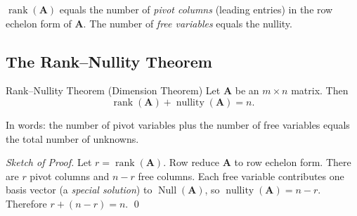\documentclass[12pt,a4paper]{article}
\newcommand{\rank}{\operatorname{rank}}
\newcommand{\nullity}{\operatorname{nullity}}
\newcommand{\Null}{\operatorname{Null}}
\newcommand{\mat}[1]{\mathbf{#1}}
\begin{document}
	\begin{remarkbox}{}{}
		\(\rank(\mat{A})\) equals the number of \emph{pivot columns} (leading entries) in the
		row echelon form of \(\mat{A}\).  The number of \emph{free variables} equals the
		nullity.
	\end{remarkbox}
	
	\subsection{The Rank--Nullity Theorem}
	
	\begin{thmbox}{Rank--Nullity Theorem (Dimension Theorem)}{}
		Let \(\mat{A}\) be an \(m \times n\) matrix.  Then
		\[
		\boxed{\rank(\mat{A}) + \nullity(\mat{A}) = n.}
		\]
	\end{thmbox}
	
	In words: the number of pivot variables plus the number of free variables equals the
	total number of unknowns.
	
	\begin{proof}[Sketch of Proof]
		Let \(r = \rank(\mat{A})\).  Row reduce \(\mat{A}\) to row echelon form.  There are
		\(r\) pivot columns and \(n - r\) free columns.  Each free variable contributes one
		basis vector (a \emph{special solution}) to \(\Null(\mat{A})\), so
		\(\nullity(\mat{A}) = n - r\).  Therefore \(r + (n - r) = n\). \qed
	\end{proof}
	
\end{document}
